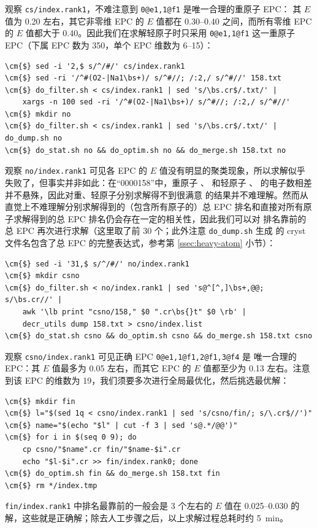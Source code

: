 观察 \verb|cs/index.rank1|，不难注意到 \verb|0@e1,1@f1| 是唯一合理的重原子 EPC：
其 $E$ 值为 0.20 左右，其它非零维 EPC 的 $E$ 值都在 0.30--0.40 之间，而所有零维
EPC 的 $E$ 值都大于 0.40。因此我们在求解轻原子时只采用 \verb|0@e1,1@f1|
这一重原子 EPC（下属 EPC 数为 350，单个 EPC 维数为 6--15）：
\begin{Verbatim}
\cm{$} sed -i '2,$ s/^/#/' cs/index.rank1
\cm{$} sed -ri '/^#(O2-|Na1\bs+)/ s/^#//; /:2,/ s/^#//' 158.txt
\cm{$} do_filter.sh < cs/index.rank1 | sed 's/\bs.cr$/.txt/' |
	xargs -n 100 sed -ri '/^#(O2-|Na1\bs+)/ s/^#//; /:2,/ s/^#//'
\cm{$} mkdir no
\cm{$} do_filter.sh < cs/index.rank1 | sed 's/\bs.cr$/.txt/' | do_dump.sh no
\cm{$} do_stat.sh no && do_optim.sh no && do_merge.sh 158.txt no
\end{Verbatim}
观察 \verb|no/index.rank1| 可见各 EPC 的 $E$ 值没有明显的聚类现象，所以求解似乎
失败了，但事实并非如此：在“0000158”中，重原子 、 和轻原子
、 的电子数相差并不悬殊，因此对重、轻原子分别求解得不到很满意
的结果并不难理解。然而从直觉上不难理解分别求解得到的（包含所有原子的）总 EPC
排名和直接对所有原子求解得到的总 EPC 排名仍会存在一定的相关性，因此我们可以对
排名靠前的总 EPC 再次进行求解（这里取了前 30 个；此外注意 \verb|do_dump.sh| 生成
的 cryst 文件名包含了总 EPC 的完整表达式，参考第 \ref{ssec:heavy-atom} 小节）：
\begin{Verbatim}
\cm{$} sed -i '31,$ s/^/#/' no/index.rank1
\cm{$} mkdir csno
\cm{$} do_filter.sh < no/index.rank1 | sed 's@^[^,]\bs+,@@; s/\bs.cr//' |
	awk '\lb print "csno/158," $0 ".cr\bs{}t" $0 \rb' |
	decr_utils dump 158.txt > csno/index.list
\cm{$} do_stat.sh csno && do_optim.sh csno && do_merge.sh 158.txt csno
\end{Verbatim}

观察 \verb|csno/index.rank1| 可见正确 EPC \verb|0@e1,1@f1,2@f1,3@f4| 是
唯一合理的 EPC：其 $E$ 值最多为 0.05 左右，而其它 EPC 的 $E$ 值都至少为 0.13
左右。注意到该 EPC 的维数为 19，我们须要多次进行全局最优化，然后挑选最优解：
\begin{Verbatim}
\cm{$} mkdir fin
\cm{$} l="$(sed 1q < csno/index.rank1 | sed 's/csno/fin/; s/\.cr$//')"
\cm{$} name="$(echo "$l" | cut -f 3 | sed 's@.*/@@')"
\cm{$} for i in $(seq 0 9); do
	cp csno/"$name".cr fin/"$name-$i".cr
	echo "$l-$i".cr >> fin/index.rank0; done
\cm{$} do_optim.sh fin && do_merge.sh 158.txt fin
\cm{$} rm */index.tmp
\end{Verbatim}
\verb|fin/index.rank1| 中排名最靠前的一般会是 3 个左右的 $E$ 值在 0.025--0.030
的解，这些就是正确解；除去人工步骤之后，以上求解过程总耗时约 \SI{5}{\minute}。

